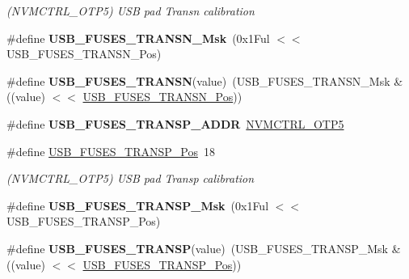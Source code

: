\begin{DoxyCompactItemize}
\begin{DoxyCompactList}\small\item\em (N\+V\+M\+C\+T\+R\+L\+\_\+\+O\+T\+P5) U\+S\+B pad Transn calibration \end{DoxyCompactList}\item 
\hypertarget{group__fuses__api_ga34a4daed05b8db2ea3ad1cfcb0a15b47}{}\#define {\bfseries U\+S\+B\+\_\+\+F\+U\+S\+E\+S\+\_\+\+T\+R\+A\+N\+S\+N\+\_\+\+Msk}~(0x1\+Ful $<$$<$ U\+S\+B\+\_\+\+F\+U\+S\+E\+S\+\_\+\+T\+R\+A\+N\+S\+N\+\_\+\+Pos)\label{group__fuses__api_ga34a4daed05b8db2ea3ad1cfcb0a15b47}

\item 
\hypertarget{group__fuses__api_gaf1d4ce25c05cdd9ec50e268889839292}{}\#define {\bfseries U\+S\+B\+\_\+\+F\+U\+S\+E\+S\+\_\+\+T\+R\+A\+N\+S\+N}(value)~(U\+S\+B\+\_\+\+F\+U\+S\+E\+S\+\_\+\+T\+R\+A\+N\+S\+N\+\_\+\+Msk \& ((value) $<$$<$ \hyperlink{group__fuses__api_gab0e7f93b7c247b3159128648a749719f}{U\+S\+B\+\_\+\+F\+U\+S\+E\+S\+\_\+\+T\+R\+A\+N\+S\+N\+\_\+\+Pos}))\label{group__fuses__api_gaf1d4ce25c05cdd9ec50e268889839292}

\item 
\hypertarget{group__fuses__api_ga9945c7615643af7f5a4b39ca14dcb5a8}{}\#define {\bfseries U\+S\+B\+\_\+\+F\+U\+S\+E\+S\+\_\+\+T\+R\+A\+N\+S\+P\+\_\+\+A\+D\+D\+R}~\hyperlink{group___s_a_m_l21_j18_a__base_ga0bf5d3de41242cbb1e7b91ef11d6b794}{N\+V\+M\+C\+T\+R\+L\+\_\+\+O\+T\+P5}\label{group__fuses__api_ga9945c7615643af7f5a4b39ca14dcb5a8}

\item 
\hypertarget{group__fuses__api_gaa2619428e9443f013405e7411b2f36ec}{}\#define \hyperlink{group__fuses__api_gaa2619428e9443f013405e7411b2f36ec}{U\+S\+B\+\_\+\+F\+U\+S\+E\+S\+\_\+\+T\+R\+A\+N\+S\+P\+\_\+\+Pos}~18\label{group__fuses__api_gaa2619428e9443f013405e7411b2f36ec}

\begin{DoxyCompactList}\small\item\em (N\+V\+M\+C\+T\+R\+L\+\_\+\+O\+T\+P5) U\+S\+B pad Transp calibration \end{DoxyCompactList}\item 
\hypertarget{group__fuses__api_gac808c85c705c2227ffe3c6e7f864935e}{}\#define {\bfseries U\+S\+B\+\_\+\+F\+U\+S\+E\+S\+\_\+\+T\+R\+A\+N\+S\+P\+\_\+\+Msk}~(0x1\+Ful $<$$<$ U\+S\+B\+\_\+\+F\+U\+S\+E\+S\+\_\+\+T\+R\+A\+N\+S\+P\+\_\+\+Pos)\label{group__fuses__api_gac808c85c705c2227ffe3c6e7f864935e}

\item 
\hypertarget{group__fuses__api_ga775fc7aa8cd8a6c499b00c70bff4691c}{}\#define {\bfseries U\+S\+B\+\_\+\+F\+U\+S\+E\+S\+\_\+\+T\+R\+A\+N\+S\+P}(value)~(U\+S\+B\+\_\+\+F\+U\+S\+E\+S\+\_\+\+T\+R\+A\+N\+S\+P\+\_\+\+Msk \& ((value) $<$$<$ \hyperlink{group__fuses__api_gaa2619428e9443f013405e7411b2f36ec}{U\+S\+B\+\_\+\+F\+U\+S\+E\+S\+\_\+\+T\+R\+A\+N\+S\+P\+\_\+\+Pos}))\label{group__fuses__api_ga775fc7aa8cd8a6c499b00c70bff4691c}


\end{DoxyCompactItemize}
